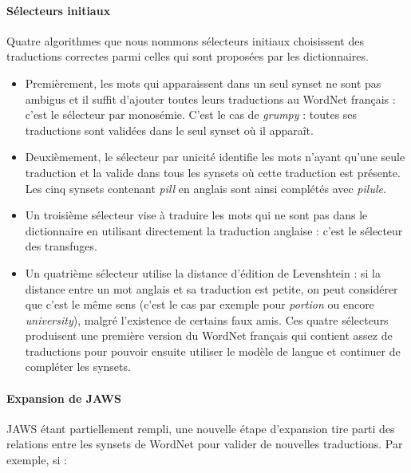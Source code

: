\paragraph{Sélecteurs initiaux} Quatre algorithmes que nous nommons sélecteurs
initiaux choisissent des traductions correctes parmi celles qui sont proposées
par les dictionnaires.

\begin{itemize}

    \item Premièrement, les mots qui apparaissent dans un seul synset ne sont
        pas ambigus et il suffit d'ajouter toutes leurs traductions au WordNet
        français : c'est le sélecteur par monosémie. C'est le cas de
        \textit{grumpy} : toutes ses traductions sont validées dans le seul
        synset où il apparaît.

    \item Deuxièmement, le sélecteur par unicité identifie les mots n'ayant
        qu'une seule traduction et la valide dans tous les synsets où cette
        traduction est présente. Les cinq synsets contenant \textit{pill} en
        anglais sont ainsi complétés avec \textit{pilule}.

    \item Un troisième sélecteur vise à traduire les mots qui ne sont pas dans
        le dictionnaire en utilisant directement la traduction anglaise : c'est
        le sélecteur des transfuges.

    \item Un quatrième sélecteur utilise la distance d'édition de Levenshtein :
        si la distance entre un mot anglais et sa traduction est petite, on
        peut considérer que c'est le même sens (c'est le cas par exemple pour
        \textit{portion} ou encore \textit{university}), malgré l'existence de
        certains faux amis. Ces quatre sélecteurs produisent une première
        version du WordNet français qui contient assez de traductions pour
        pouvoir ensuite utiliser le modèle de langue et continuer de compléter
        les synsets.

\end{itemize}

\paragraph{Expansion de JAWS} JAWS étant partiellement rempli, une nouvelle étape d'expansion tire parti des relations entre les synsets de WordNet pour valider de nouvelles traductions. Par exemple, si :

